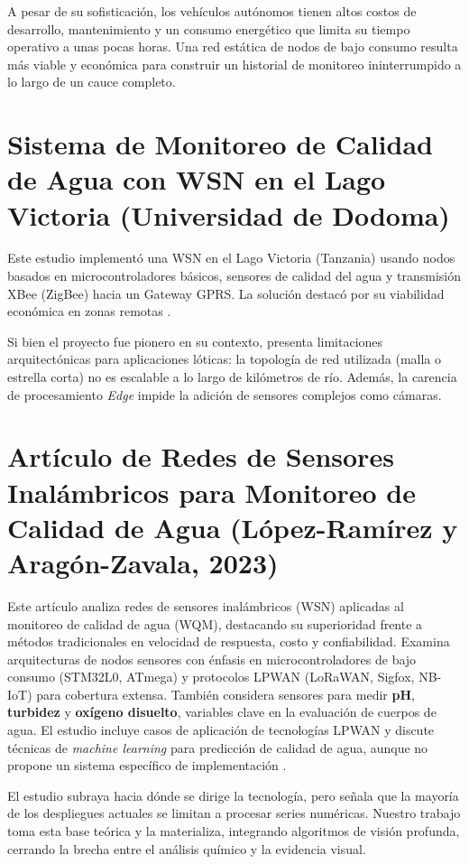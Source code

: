 A pesar de su sofisticación, los vehículos autónomos tienen altos costos de desarrollo, mantenimiento y un consumo energético que limita su tiempo operativo a unas pocas horas. Una red estática de nodos de bajo consumo resulta más viable y económica para construir un historial de monitoreo ininterrumpido a lo largo de un cauce completo.

\section{Sistema de Monitoreo de Calidad de Agua con WSN en el Lago Victoria (Universidad de Dodoma)}

Este estudio implementó una WSN en el Lago Victoria (Tanzania) usando nodos basados en microcontroladores básicos, sensores de calidad del agua y transmisión XBee (ZigBee) hacia un Gateway GPRS. La solución destacó por su viabilidad económica en zonas remotas \cite{faustine2014}.

Si bien el proyecto fue pionero en su contexto, presenta limitaciones arquitectónicas para aplicaciones lóticas: la topología de red utilizada (malla o estrella corta) no es escalable a lo largo de kilómetros de río. Además, la carencia de procesamiento \textit{Edge} impide la adición de sensores complejos como cámaras.

\section{Artículo de Redes de Sensores Inalámbricos para Monitoreo de Calidad de Agua (López-Ramírez y Aragón-Zavala, 2023)}

Este artículo analiza redes de sensores inalámbricos (WSN) aplicadas al monitoreo de calidad de agua (WQM), destacando su superioridad frente a métodos tradicionales en velocidad de respuesta, costo y confiabilidad. Examina arquitecturas de nodos sensores con énfasis en microcontroladores de bajo consumo (STM32L0, ATmega) y protocolos LPWAN (LoRaWAN, Sigfox, NB-IoT) para cobertura extensa. También considera sensores para medir \textbf{pH}, \textbf{turbidez} y \textbf{oxígeno disuelto}, variables clave en la evaluación de cuerpos de agua. El estudio incluye casos de aplicación de tecnologías LPWAN y discute técnicas de \textit{machine learning} para predicción de calidad de agua, aunque no propone un sistema específico de implementación \cite{lopez2023}.

El estudio subraya hacia dónde se dirige la tecnología, pero señala que la mayoría de los despliegues actuales se limitan a procesar series numéricas. Nuestro trabajo toma esta base teórica y la materializa, integrando algoritmos de visión profunda, cerrando la brecha entre el análisis químico y la evidencia visual.

